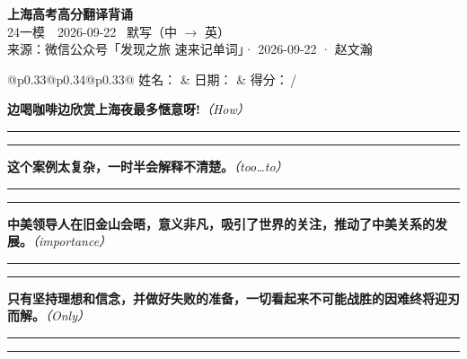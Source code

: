 \documentclass[11pt,a4paper]{article}
\newcommand{\num}[1]{\makebox[1.9em][r]{#1.}\hspace{0.3em}}
\newcommand{\wline}{\noindent\rule{\linewidth}{0.4pt}}
\newcommand{\prompt}[1]{\emph{\textcolor{tipblue}{\small（#1）}}}
\begin{document}
\pagestyle{plain}
\begin{center}
{\LARGE\bfseries 上海高考高分翻译背诵 }\\[0.25em]
{\large 24一模　2026-09-22 \quad\ 默写（中 $\to$ 英）}\\[0.35em]
{\footnotesize 来源：微信公众号「发现之旅 速来记单词」· 2026-09-22 · 赵文瀚}
\end{center}

\vspace{0.4em}
\noindent\begin{tabular}{@{}p{0.33\textwidth}@{}p{0.34\textwidth}@{}p{0.33\textwidth}@{}}
姓名：\underline{\hspace{2.0cm}} & 日期：\underline{\hspace{2.0cm}} & 得分：\underline{\hspace{1.4cm}}\,/ \\
\end{tabular}

\vspace{0.5em}

\vspace{0.8em}
\num{1}\textbf{边喝咖啡边欣赏上海夜最多惬意呀!}\prompt{How}

\vspace{0.3em}

\wline\vspace{0.3em}
\wline

\num{2}\textbf{这个案例太复杂，一时半会解释不清楚。}\prompt{too…to}

\vspace{0.3em}

\wline\vspace{0.3em}
\wline

\num{3}\textbf{中美领导人在旧金山会晤，意义非凡，吸引了世界的关注，推动了中美关系的发展。}\prompt{importance}

\vspace{0.3em}

\wline\vspace{0.3em}
\wline

\num{4}\textbf{只有坚持理想和信念，并做好失败的准备，一切看起来不可能战胜的因难终将迎刃而解。}\prompt{Only}

\vspace{0.3em}

\wline\vspace{0.3em}
\wline
\end{document}
